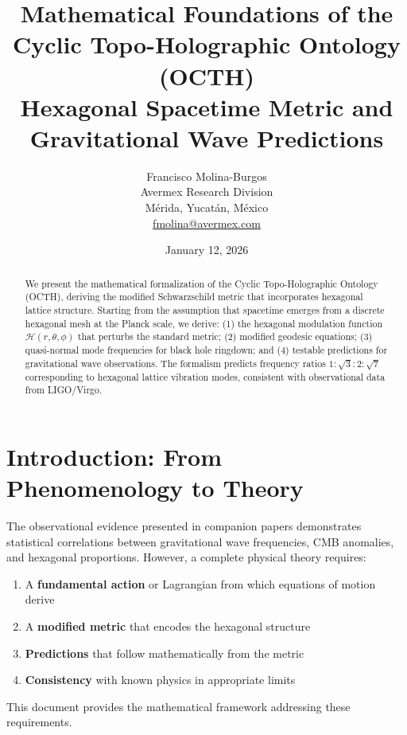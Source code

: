 \documentclass[12pt,a4paper]{article}
\title{\Large\textbf{Mathematical Foundations of the Cyclic Topo-Holographic Ontology (OCTH)}\\[0.5em]
\large Hexagonal Spacetime Metric and Gravitational Wave Predictions}
\author{
Francisco Molina-Burgos\\[0.5em]
\small Avermex Research Division\\
\small M\'erida, Yucat\'an, M\'exico\\
\small \href{mailto:fmolina@avermex.com}{fmolina@avermex.com}
}
\date{January 12, 2026}
\begin{document}
\maketitle

\begin{abstract}
We present the mathematical formalization of the Cyclic Topo-Holographic Ontology (OCTH), deriving the modified Schwarzschild metric that incorporates hexagonal lattice structure. Starting from the assumption that spacetime emerges from a discrete hexagonal mesh at the Planck scale, we derive: (1) the hexagonal modulation function $\mathcal{H}(r,\theta,\phi)$ that perturbs the standard metric; (2) modified geodesic equations; (3) quasi-normal mode frequencies for black hole ringdown; and (4) testable predictions for gravitational wave observations. The formalism predicts frequency ratios $1:\sqrt{3}:2:\sqrt{7}$ corresponding to hexagonal lattice vibration modes, consistent with observational data from LIGO/Virgo.
\end{abstract}

\tableofcontents
\newpage

\section{Introduction: From Phenomenology to Theory}

The observational evidence presented in companion papers demonstrates statistical correlations between gravitational wave frequencies, CMB anomalies, and hexagonal proportions. However, a complete physical theory requires:

\begin{enumerate}
    \item A \textbf{fundamental action} or Lagrangian from which equations of motion derive
    \item A \textbf{modified metric} that encodes the hexagonal structure
    \item \textbf{Predictions} that follow mathematically from the metric
    \item \textbf{Consistency} with known physics in appropriate limits
\end{enumerate}

This document provides the mathematical framework addressing these requirements.

\end{document}
